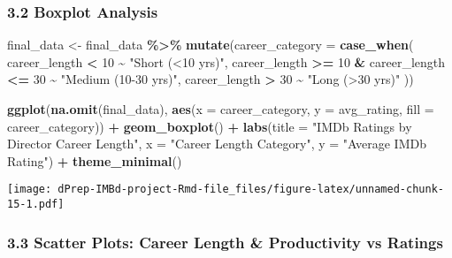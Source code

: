 \documentclass[
]{article}
\newenvironment{Shaded}{\begin{snugshade}}{\end{snugshade}}
\newcommand{\AttributeTok}[1]{\textcolor[rgb]{0.13,0.29,0.53}{#1}}
\newcommand{\DecValTok}[1]{\textcolor[rgb]{0.00,0.00,0.81}{#1}}
\newcommand{\FunctionTok}[1]{\textcolor[rgb]{0.13,0.29,0.53}{\textbf{#1}}}
\newcommand{\NormalTok}[1]{#1}
\newcommand{\OtherTok}[1]{\textcolor[rgb]{0.56,0.35,0.01}{#1}}
\newcommand{\SpecialCharTok}[1]{\textcolor[rgb]{0.81,0.36,0.00}{\textbf{#1}}}
\newcommand{\StringTok}[1]{\textcolor[rgb]{0.31,0.60,0.02}{#1}}
\begin{document}
\subsubsection{3.2 Boxplot Analysis}\label{boxplot-analysis}

\begin{Shaded}
\begin{Highlighting}[]
\NormalTok{final\_data }\OtherTok{\textless{}{-}}\NormalTok{ final\_data }\SpecialCharTok{\%\textgreater{}\%}
  \FunctionTok{mutate}\NormalTok{(}\AttributeTok{career\_category =} \FunctionTok{case\_when}\NormalTok{(}
\NormalTok{    career\_length }\SpecialCharTok{\textless{}} \DecValTok{10} \SpecialCharTok{\textasciitilde{}} \StringTok{"Short (\textless{}10 yrs)"}\NormalTok{,}
\NormalTok{    career\_length }\SpecialCharTok{\textgreater{}=} \DecValTok{10} \SpecialCharTok{\&}\NormalTok{ career\_length }\SpecialCharTok{\textless{}=} \DecValTok{30} \SpecialCharTok{\textasciitilde{}} \StringTok{"Medium (10{-}30 yrs)"}\NormalTok{,}
\NormalTok{    career\_length }\SpecialCharTok{\textgreater{}} \DecValTok{30} \SpecialCharTok{\textasciitilde{}} \StringTok{"Long (\textgreater{}30 yrs)"}
\NormalTok{  ))}

\FunctionTok{ggplot}\NormalTok{(}\FunctionTok{na.omit}\NormalTok{(final\_data), }\FunctionTok{aes}\NormalTok{(}\AttributeTok{x =}\NormalTok{ career\_category, }\AttributeTok{y =}\NormalTok{ avg\_rating, }\AttributeTok{fill =}\NormalTok{ career\_category)) }\SpecialCharTok{+}
  \FunctionTok{geom\_boxplot}\NormalTok{() }\SpecialCharTok{+}
  \FunctionTok{labs}\NormalTok{(}\AttributeTok{title =} \StringTok{"IMDb Ratings by Director Career Length"}\NormalTok{,}
       \AttributeTok{x =} \StringTok{"Career Length Category"}\NormalTok{,}
       \AttributeTok{y =} \StringTok{"Average IMDb Rating"}\NormalTok{) }\SpecialCharTok{+}
  \FunctionTok{theme\_minimal}\NormalTok{()}
\end{Highlighting}
\end{Shaded}

\texttt{[image: dPrep-IMBd-project-Rmd-file\_files/figure-latex/unnamed-chunk-15-1.pdf]}

\subsubsection{3.3 Scatter Plots: Career Length \& Productivity vs
Ratings}\label{scatter-plots-career-length-productivity-vs-ratings}
\end{document}
